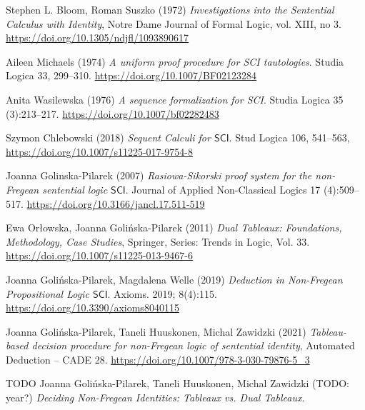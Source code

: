 \documentclass{article}
\theoremstyle{definition}
\newtheorem{definition}{Definition}[section]
\theoremstyle{definition}
\theoremstyle{definition}
\newcommand{\SCI}{$\mathsf{SCI}$\xspace}
\begin{document}
\begin{thebibliography}{9}
    Stephen L. Bloom, Roman Suszko (1972) \emph{Investigations into the Sentential Calculus with Identity}, Notre Dame Journal of Formal Logic, vol. XIII, no 3. \url{https://doi.org/10.1305/ndjfl/1093890617}

    Aileen Michaels (1974) \emph{A uniform proof procedure for SCI tautologies}. Studia Logica 33, 299--310. \url{https://doi.org/10.1007/BF02123284}

    Anita Wasilewska (1976) \emph{A sequence formalization for SCI}. Studia Logica 35 (3):213--217. \url{https://doi.org/10.1007/bf02282483}

    Szymon Chlebowski (2018) \emph{Sequent Calculi for \SCI}. Stud Logica 106, 541--563, \url{https://doi.org/10.1007/s11225-017-9754-8}

    Joanna Golinska-Pilarek (2007) \emph{Rasiowa-Sikorski proof system for the non-Fregean sentential logic \SCI}. Journal of Applied Non-Classical Logics 17 (4):509--517. \url{https://doi.org/10.3166/jancl.17.511-519}

    Ewa Orłowska, Joanna Golińska-Pilarek (2011) \emph{Dual Tableaux: Foundations, Methodology, Case Studies}, Springer, Series: Trends in Logic, Vol. 33. \url{https://doi.org/10.1007/s11225-013-9467-6}

    Joanna Golińska-Pilarek, Magdalena Welle (2019) \emph{Deduction in Non-Fregean Propositional Logic \SCI}. Axioms. 2019; 8(4):115. \url{https://doi.org/10.3390/axioms8040115}

    Joanna Golińska-Pilarek, Taneli Huuskonen, Michal Zawidzki (2021) \emph{Tableau-based decision procedure for non-Fregean logic of sentential identity}, Automated Deduction -- CADE 28. \url{https://doi.org/10.1007/978-3-030-79876-5_3}

    {
        \color{red}
        TODO Joanna Golińska-Pilarek, Taneli Huuskonen, Michal Zawidzki (TODO: year?) \emph{Deciding Non-Fregean Identities: Tableaux vs. Dual Tableaux}.
    }

\end{thebibliography}


\end{document}
